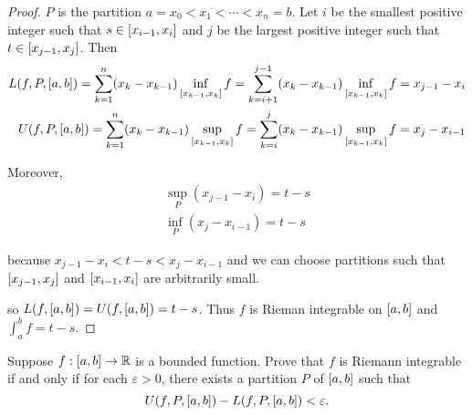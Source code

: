 \begin{proof}
    $P$ is the partition $a = x_{0} < x_{1} < \cdots < x_{n} = b$. Let $i$ be the smallest positive integer such that $s\in\left[{x_{i-1}, x_{i}}\right]$ and $j$ be the largest positive integer such that $t\in\left[{x_{j-1}, x_{j}}\right]$. Then
    \[
        \begin{split}
            L(f, P, \left[{a, b}\right]) = \sum^{n}_{k=1}(x_{k} - x_{k-1})\inf\limits_{\left[{x_{k-1}, x_{k}}\right]}f = \sum^{j-1}_{k=i+1}(x_{k} - x_{k-1})\inf\limits_{\left[{x_{k-1}, x_{k}}\right]}f = x_{j-1} - x_{i} \\
            U(f, P, \left[{a, b}\right]) = \sum^{n}_{k=1}(x_{k} - x_{k-1})\sup\limits_{\left[{x_{k-1}, x_{k}}\right]}f = \sum^{j}_{k=i}(x_{k} - x_{k-1})\sup\limits_{\left[{x_{k-1}, x_{k}}\right]}f  = x_{j} - x_{i-1}
        \end{split}
    \]

    Moreover,
    \[
        \begin{split}
            \sup\limits_{P}(x_{j-1} - x_{i}) = t - s \\
            \inf\limits_{P}(x_{j} - x_{i-1}) = t - s
        \end{split}
    \]

    because $x_{j-1} - x_{i} < t - s < x_{j} - x_{i-1}$ and we can choose partitions such that $\left[{x_{j-1}, x_{j}}\right]$ and $\left[{x_{i-1}, x_{i}}\right]$ are arbitrarily small.

    so $L(f, \left[{a, b}\right]) = U(f, \left[{a, b}\right]) = t - s$. Thus $f$ is Rieman integrable on $\left[{a, b}\right]$ and $\int^{b}_{a}f = t - s$.
\end{proof}
\newpage

\begin{exercise}\label{chapter1:sectionA:exercise3}
    Suppose $f: \left[{a, b}\right]\to \mathbb{R}$ is a bounded function. Prove that $f$ is Riemann integrable if and only if for each $\varepsilon > 0$, there exists a partition $P$ of $\left[{a, b}\right]$ such that
    \[
        U(f, P, \left[{a, b}\right]) - L(f, P, \left[{a, b}\right]) < \varepsilon.
    \]
\end{exercise}

